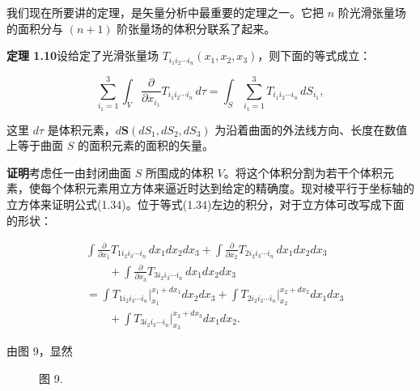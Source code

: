 \documentclass[11pt,a4paper,oneside]{ctexbook}
\newcommand{\ve}[1]{\bm{#1}}
\begin{document}
我们现在所要讲的定理，是矢量分析中最重要的定理之一。它把 $n$ 阶光滑张量场的面积分与 $(n + 1)$ 阶张量场的体积分联系了起来。

\textbf{定理 1.10}\quad 设给定了光滑张量场 $T_{i_1 i_2 \cdots i_n}(x_1, x_2, x_3)$，则下面的等式成立：

\begin{equation}
\sum_{i_1 = 1}^{3} \int_{V} \frac{\partial}{\partial x_{i_1}} T_{i_1 i_2 \cdots i_n}\, d\tau
= \int_{S} \sum_{i_1 = 1}^{3} T_{i_1 i_2 \cdots i_n}\, dS_{i_1},
\tag{1.34}
\end{equation}

这里 $d\tau$ 是体积元素，$d\ve{S}(dS_1, dS_2, dS_3)$ 为沿着曲面的外法线方向、长度在数值上等于曲面 $S$ 的面积元素的面积的矢量。

\textbf{证明}\quad 考虑任一由封闭曲面 $S$ 所围成的体积 $V$。将这个体积分割为若干个体积元素，使每个体积元素用立方体来逼近时达到给定的精确度。现对棱平行于坐标轴的立方体来证明公式(1.34)。位于等式(1.34)左边的积分，对于立方体可改写成下面的形状：

\begin{equation}
\begin{aligned}
&\int \frac{\partial}{\partial x_1} T_{1 i_2 i_3 \cdots i_n}\, dx_1 dx_2 dx_3
 + \int \frac{\partial}{\partial x_2} T_{2 i_2 i_3 \cdots i_n}\, dx_1 dx_2 dx_3\\
&\qquad + \int \frac{\partial}{\partial x_3} T_{3 i_2 i_3 \cdots i_n}\, dx_1 dx_2 dx_3\\
&= \int T_{1 i_2 i_3 \cdots i_n} \Big|_{x_1}^{x_1 + dx_1} dx_2 dx_3
 + \int T_{2 i_2 i_3 \cdots i_n} \Big|_{x_2}^{x_2 + dx_2} dx_1 dx_3\\
&\qquad + \int T_{3 i_2 i_3 \cdots i_n} \Big|_{x_3}^{x_3 + dx_3} dx_1 dx_2.
\end{aligned}
\tag{1.35}
\end{equation}

由图 9，显然

\begin{figure}[htbp]
\centering
{}
\par\vspace{2pt}
{\small 图 9.}
\end{figure}
\end{document}
